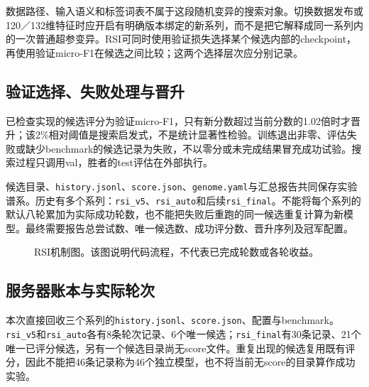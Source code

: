 \documentclass[10pt,twocolumn,letterpaper]{article}
\newcommand{\code}[1]{\texttt{\small #1}}
\begin{document}
数据路径、输入语义和标签词表不属于这段随机变异的搜索对象。切换数据发布或120／132维特征时应开启有明确版本绑定的新系列，而不是把它解释成同一系列内的一次普通超参变异。RSI可同时使用验证损失选择某个候选内部的checkpoint，再使用验证micro-F1在候选之间比较；这两个选择层次应分别记录。

\subsection{验证选择、失败处理与晋升}
已检查实现的候选评分为验证micro-F1，只有新分数超过当前分数的1.02倍时才晋升；该2\%相对阈值是搜索启发式，不是统计显著性检验。训练退出非零、评估失败或缺少benchmark的候选记录为失败，不以零分或未完成结果冒充成功试验。搜索过程只调用val，胜者的test评估在外部执行。

候选目录、\code{history.jsonl}、\code{score.json}、\code{genome.yaml}与汇总报告共同保存实验谱系。历史有多个系列：\code{rsi\_v5}、\code{rsi\_auto}和后续\code{rsi\_final}。不能将每个系列的默认八轮累加为实际成功轮数，也不能把失败后重跑的同一候选重复计算为新模型。最终需要报告总尝试数、唯一候选数、成功评分数、晋升序列及冠军配置。

\begin{figure}[t]
\centering
{}
\caption{RSI机制图。该图说明代码流程，不代表已完成轮数或各轮收益。}
\label{fig:rsi}
\end{figure}

\subsection{服务器账本与实际轮次}
本次直接回收三个系列的\code{history.jsonl}、\code{score.json}、配置与benchmark。\code{rsi\_v5}和\code{rsi\_auto}各有8条轮次记录、6个唯一候选；\code{rsi\_final}有30条记录、21个唯一已评分候选，另有一个候选目录尚无score文件。重复出现的候选复用既有评分，因此不能把46条记录称为46个独立模型，也不将当前无score的目录算作成功实验。
\end{document}
